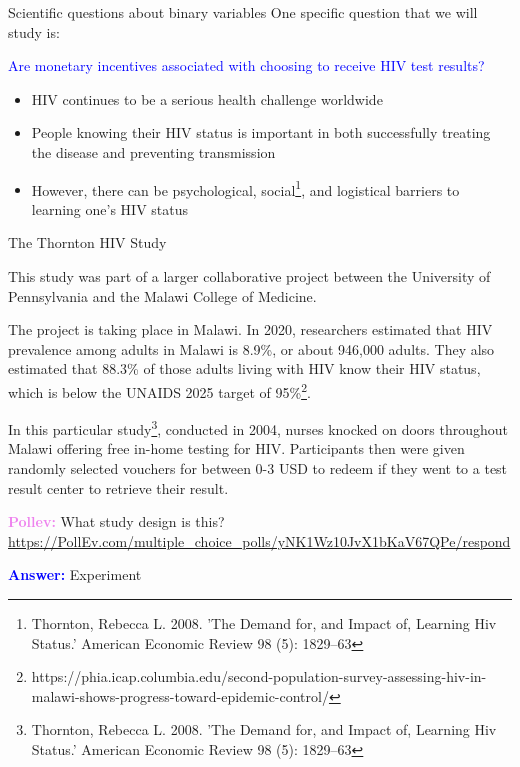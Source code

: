 \documentclass[10pt,t]{beamer}
\begin{document}
\begin{frame}{Scientific questions about binary variables}
	One specific question that we will study is:

		\bigskip
		
\textcolor{blue}{Are monetary incentives associated with choosing to receive HIV test results?}

	\vspace{0.7cm}
	
	\begin{itemize}
		\item HIV continues to be a serious health challenge worldwide
		\medskip
		
		\item People knowing their HIV status is important in both successfully treating the disease and preventing transmission
		
		\medskip
		
		\item However, there can be psychological, social\footnote{Thornton, Rebecca L. 2008. 'The Demand for, and Impact of, Learning Hiv Status.' American Economic Review 98 (5): 1829–63}, and logistical barriers to learning one's HIV status
	\end{itemize}
\end{frame}

\begin{frame}{The Thornton HIV Study}
	\vspace{-10 mm}
	
	This study was part of a larger collaborative project between the University of Pennsylvania and the Malawi College of Medicine.
	
	\medskip
	
	The project is taking place in Malawi. In 2020, researchers estimated that HIV prevalence among adults in Malawi is 8.9\%, or about 946,000 adults. They also estimated that 88.3\% of those adults living with HIV know their HIV status, which is below the UNAIDS 2025 target of 95\%\footnote{https://phia.icap.columbia.edu/second-population-survey-assessing-hiv-in-malawi-shows-progress-toward-epidemic-control/}.
	
	\medskip
	
	In this particular study\footnote{Thornton, Rebecca L. 2008. 'The Demand for, and Impact of, Learning Hiv Status.' American Economic Review 98 (5): 1829–63}, conducted in 2004, nurses knocked on doors throughout Malawi offering free in-home testing for HIV. Participants then were given randomly selected vouchers for between 0-3 USD to redeem if they went to a test result center to retrieve their result.
	
	\smallskip
	
	\textcolor{violet}{\textbf{Pollev:}} What study design is this?
	\tiny{\url{https://PollEv.com/multiple_choice_polls/yNK1Wz10JvX1bKaV67QPe/respond}}
	\normalsize
	
	\textcolor{blue}{\textbf{Answer:}} Experiment
\end{frame}
\end{document}
